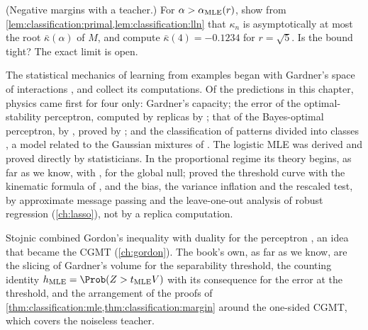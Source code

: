 \begin{refsection}
\begin{exercises}
\item \research (Negative margins with a teacher.) For $\alpha>\alpha_{\mathrm{MLE}}(r)$, show from \cref{lem:classification:primal,lem:classification:lln} that $\kappa_n$ is asymptotically at most the root $\bar\kappa(\alpha)$ of $M$, and compute $\bar\kappa(4)=-0.1234$ for $r=\sqrt5$. Is the bound tight? The exact limit is open.\label{ex:classification:negative}
\end{exercises}

\notesandrefs
The statistical mechanics of learning from examples began with Gardner's space of interactions \parencite{Gardner1988,GardnerDerrida1988}, and \textcite{EngelVandenBroeck2001} collect its computations. Of the predictions in this chapter, physics came first for four only: Gardner's capacity; the error of the optimal-stability perceptron, computed by replicas by \textcite{OpperEtAl1990}; that of the Bayes-optimal perceptron, by \textcite{OpperHaussler1991}, proved by \textcite{BarbierEtAl2019}; and the classification of patterns divided into classes \parencite{DelGiudiceFranzVirasoro1989}, a model related to the Gaussian mixtures of \textcite{MignaccoEtAl2020}. The logistic MLE was derived and proved directly by statisticians. In the proportional regime its theory begins, as far as we know, with \textcite{SurChenCandes2019}, for the global null; \textcite{CandesSur2020} proved the threshold curve with the kinematic formula of \textcite{AmelunxenEtAl2014}, and \textcite{SurCandes2019} the bias, the variance inflation and the rescaled test, by approximate message passing and the leave-one-out analysis of robust regression (\cref{ch:lasso}), not by a replica computation.

Stojnic combined Gordon's inequality \parencite{Gordon1985} with duality for the perceptron \parencite{Stojnic2013a,Stojnic2013b}, an idea that became the CGMT (\cref{ch:gordon}). The book's own, as far as we know, are the slicing of Gardner's volume for the separability threshold, the counting identity $\classificationh=\Prob(Z>t_{\mathrm{MLE}}V)$ with its consequence for the error at the threshold, and the arrangement of the proofs of \cref{thm:classification:mle,thm:classification:margin} around the one-sided CGMT, which covers the noiseless teacher.


\end{refsection}
